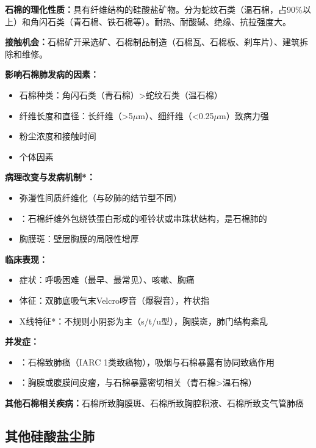 \begin{keybox}
\textbf{石棉的理化性质：}具有纤维结构的硅酸盐矿物。分为蛇纹石类（温石棉，占90\%以上）和角闪石类（青石棉、铁石棉等）。耐热、耐酸碱、绝缘、抗拉强度大。

\textbf{接触机会：}石棉矿开采选矿、石棉制品制造（石棉瓦、石棉板、刹车片）、建筑拆除和维修。

\textbf{影响石棉肺发病的因素：}
\begin{itemize}[leftmargin=*]
    \item 石棉种类：角闪石类（青石棉）>蛇纹石类（温石棉）
    \item 纤维长度和直径：长纤维（>5$\mu$m）、细纤维（<0.25$\mu$m）致病力强
    \item 粉尘浓度和接触时间
    \item 个体因素
\end{itemize}

\textbf{病理改变与发病机制*：}
\begin{itemize}[leftmargin=*]
    \item 弥漫性间质纤维化（与矽肺的结节型不同）
    \item {}：石棉纤维外包绕铁蛋白形成的哑铃状或串珠状结构，是石棉肺的
    \item 胸膜斑：壁层胸膜的局限性增厚
\end{itemize}

\textbf{临床表现：}
\begin{itemize}[leftmargin=*]
    \item 症状：呼吸困难（最早、最常见）、咳嗽、胸痛
    \item 体征：双肺底吸气末Velcro啰音（爆裂音），杵状指
    \item X线特征*：不规则小阴影为主（s/t/u型），胸膜斑，肺门结构紊乱
\end{itemize}

\textbf{并发症：}
\begin{itemize}[leftmargin=*]
    \item {}：石棉致肺癌（IARC 1类致癌物），吸烟与石棉暴露有协同致癌作用
    \item {}：胸膜或腹膜间皮瘤，与石棉暴露密切相关（青石棉>温石棉）
\end{itemize}

\textbf{其他石棉相关疾病：}石棉所致胸膜斑、石棉所致胸腔积液、石棉所致支气管肺癌
\end{keybox}

\subsection{其他硅酸盐尘肺}

